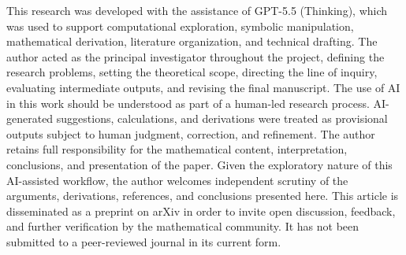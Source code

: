 \documentclass[a4paper,11pt]{article}
\numberwithin{equation}{section}
\theoremstyle{plain}
\theoremstyle{definition}
\theoremstyle{remark}
\begin{document}
This research was developed with the assistance of GPT-5.5 (Thinking), which was used to support computational exploration, symbolic manipulation, mathematical derivation, literature organization, and technical drafting. The author acted as the principal investigator throughout the project, defining the research problems, setting the theoretical scope, directing the line of inquiry, evaluating intermediate outputs, and revising the final manuscript. The use of AI in this work should be understood as part of a human-led research process. AI-generated suggestions, calculations, and derivations were treated as provisional outputs subject to human judgment, correction, and refinement. The author retains full responsibility for the mathematical content, interpretation, conclusions, and presentation of the paper. Given the exploratory nature of this AI-assisted workflow, the author welcomes independent scrutiny of the arguments, derivations, references, and conclusions presented here. This article is disseminated as a preprint on arXiv in order to invite open discussion, feedback, and further verification by the mathematical community. It has not been submitted to a peer-reviewed journal in its current form.




\end{document}
